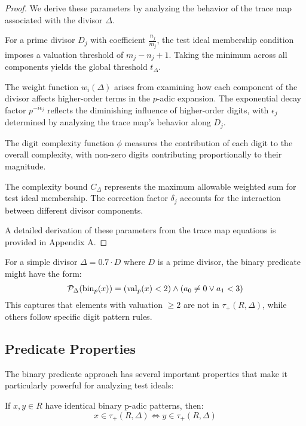 \begin{proof}
We derive these parameters by analyzing the behavior of the trace map associated with the divisor $\Delta$. 

For a prime divisor $D_j$ with coefficient $\frac{n_j}{m_j}$, the test ideal membership condition imposes a valuation threshold of $m_j - n_j + 1$. Taking the minimum across all components yields the global threshold $t_\Delta$.

The weight function $w_i(\Delta)$ arises from examining how each component of the divisor affects higher-order terms in the $p$-adic expansion. The exponential decay factor $p^{-i\epsilon_j}$ reflects the diminishing influence of higher-order digits, with $\epsilon_j$ determined by analyzing the trace map's behavior along $D_j$.

The digit complexity function $\phi$ measures the contribution of each digit to the overall complexity, with non-zero digits contributing proportionally to their magnitude.

The complexity bound $C_\Delta$ represents the maximum allowable weighted sum for test ideal membership. The correction factor $\delta_j$ accounts for the interaction between different divisor components.

A detailed derivation of these parameters from the trace map equations is provided in Appendix A.
\end{proof}

\begin{example}\label{ex:simple-predicate}
For a simple divisor $\Delta = 0.7 \cdot D$ where $D$ is a prime divisor, the binary predicate might have the form:
$$\mathcal{P}_\Delta(\operatorname{bin}_p(x)) = (\operatorname{val}_p(x) < 2) \wedge (a_0 \neq 0 \vee a_1 < 3)$$
This captures that elements with valuation $\geq 2$ are not in $\tau_+(R,\Delta)$, while others follow specific digit pattern rules.
\end{example}

\subsection{Predicate Properties}

The binary predicate approach has several important properties that make it particularly powerful for analyzing test ideals:

\begin{proposition}\label{prop:pattern-invariance}
If $x, y \in R$ have identical binary p-adic patterns, then:
$$x \in \tau_+(R,\Delta) \iff y \in \tau_+(R,\Delta)$$
\end{proposition}

